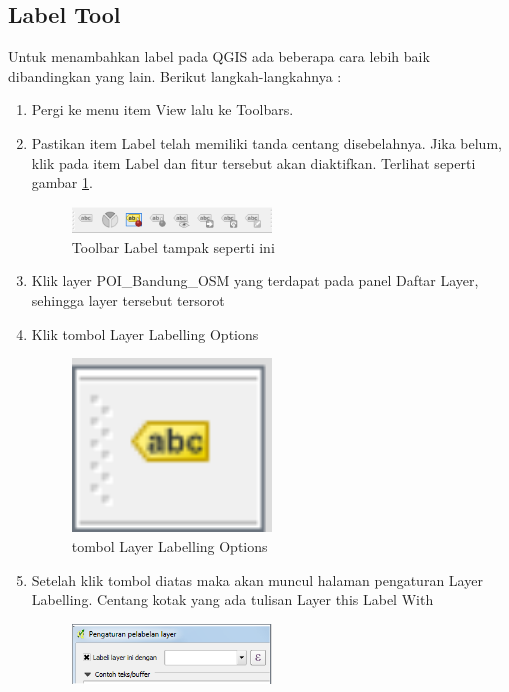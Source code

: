 \subsection{Label Tool}
Untuk menambahkan label pada QGIS ada beberapa cara lebih baik dibandingkan yang lain. Berikut langkah-langkahnya :
\begin{enumerate}
\item
Pergi ke menu item View lalu ke Toolbars.
\item
Pastikan item Label telah memiliki tanda centang disebelahnya. Jika belum, klik pada item Label dan fitur tersebut akan diaktifkan. Terlihat seperti gambar \ref{label}.
\begin{figure}[ht]
    \centerline{\includegraphics[width=0.5\textwidth]{figures/label}}
    \caption{Toolbar Label tampak seperti ini}
    \label{label}
    \end{figure}
\item
Klik layer POI\_Bandung\_OSM yang terdapat pada panel Daftar Layer, sehingga layer tersebut tersorot
\item
Klik tombol Layer Labelling Options
\begin{figure}[ht]
    \centerline{\includegraphics[width=0.5\textwidth]{figures/layer}}
    \caption{tombol Layer Labelling Options}
    \label{layer}
    \end{figure}
\item
Setelah klik tombol diatas maka akan muncul halaman pengaturan Layer Labelling. Centang kotak yang ada tulisan Layer this Label With
\begin{figure}[ht]
    \centerline{\includegraphics[width=0.5\textwidth]{figures/laylabel}}

\end{figure}
\end{enumerate}
